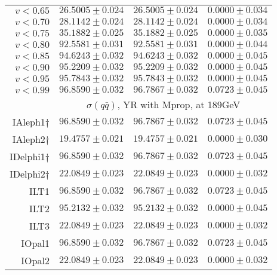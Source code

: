 \documentclass[12pt]{article}
\begin{document}
\begin{table}[!ht]
\begin{tabular}                                                                                          {||r|r|r|r||}
\\
 $ v<0.65$                       & $   26.5005\pm   0.024$ & $   26.5005\pm   0.024$ & $    0.0000\pm   0.034$
\\
 $ v<0.70$                       & $   28.1142\pm   0.024$ & $   28.1142\pm   0.024$ & $    0.0000\pm   0.034$
\\
 $ v<0.75$                       & $   35.1882\pm   0.025$ & $   35.1882\pm   0.025$ & $    0.0000\pm   0.035$
\\
 $ v<0.80$                       & $   92.5581\pm   0.031$ & $   92.5581\pm   0.031$ & $    0.0000\pm   0.044$
\\
 $ v<0.85$                       & $   94.6243\pm   0.032$ & $   94.6243\pm   0.032$ & $    0.0000\pm   0.045$
\\
 $ v<0.90$                       & $   95.2209\pm   0.032$ & $   95.2209\pm   0.032$ & $    0.0000\pm   0.045$
\\
 $ v<0.95$                       & $   95.7843\pm   0.032$ & $   95.7843\pm   0.032$ & $    0.0000\pm   0.045$
\\
 $ v<0.99$                       & $   96.8590\pm   0.032$ & $   96.7867\pm   0.032$ & $    0.0723\pm   0.045$
\\
\hline
& \multicolumn{ 3}{c||}{
     $\sigma(q\bar{q})$, YR with Mprop, at 189GeV                                     }
\\
\hline
IAleph1$\dag$                    & $   96.8590\pm   0.032$ & $   96.7867\pm   0.032$ & $    0.0723\pm   0.045$
\\
IAleph2$\dag$                    & $   19.4757\pm   0.021$ & $   19.4757\pm   0.021$ & $    0.0000\pm   0.030$
\\
IDelphi1$\dag$                   & $   96.8590\pm   0.032$ & $   96.7867\pm   0.032$ & $    0.0723\pm   0.045$
\\
IDelphi2$\dag$                   & $   22.0849\pm   0.023$ & $   22.0849\pm   0.023$ & $    0.0000\pm   0.032$
\\
ILT1                             & $   96.8590\pm   0.032$ & $   96.7867\pm   0.032$ & $    0.0723\pm   0.045$
\\
ILT2                             & $   95.2132\pm   0.032$ & $   95.2132\pm   0.032$ & $    0.0000\pm   0.045$
\\
ILT3                             & $   22.0849\pm   0.023$ & $   22.0849\pm   0.023$ & $    0.0000\pm   0.032$
\\
IOpal1                           & $   96.8590\pm   0.032$ & $   96.7867\pm   0.032$ & $    0.0723\pm   0.045$
\\
IOpal2                           & $   22.0849\pm   0.023$ & $   22.0849\pm   0.023$ & $    0.0000\pm   0.032$
\\
\hline\hline
\end{tabular}
\end{table}
 
\end{document}
